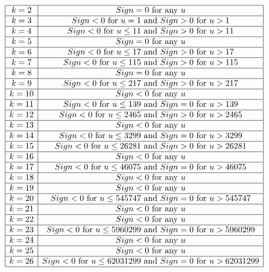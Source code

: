 \documentclass{llncs}
\begin{document}
\begin{table}
\[
\begin{array}{|c|c|}
\hline 
k=2 & Sign=0 \hbox{ for any } u \\
\hline
k=3 & Sign <0 \hbox{ for } u=1 \hbox{ and } Sign > 0 \hbox{ for } u >1\\
\hline
k=4 & Sign <0 \hbox{ for } u \leq 11 \hbox{ and } Sign > 0 \hbox{ for } u >11\\
\hline
k=5 & Sign=0 \hbox{ for any } u \\
\hline 
k=6 & Sign <0 \hbox{ for } u \leq 17 \hbox{ and } Sign > 0 \hbox{ for } u >17\\
\hline
k=7 & Sign <0 \hbox{ for } u \leq 115 \hbox{ and } Sign > 0 \hbox{ for } u >115\\
\hline
k=8 & Sign=0 \hbox{ for any } u \\ 
\hline
k=9 & Sign <0 \hbox{ for } u \leq 217 \hbox{ and } Sign > 0 \hbox{ for } u >217\\
\hline
k=10 & Sign<0 \hbox{ for any } u \\ 
\hline
k=11 & Sign <0 \hbox{ for } u \leq 139 \hbox{ and } Sign = 0 \hbox{ for } u >139\\
\hline
k=12 & Sign <0 \hbox{ for } u \leq 2465 \hbox{ and } Sign > 0 \hbox{ for } u >2465\\
\hline
k=13 & Sign<0 \hbox{ for any } u \\ 
\hline
k=14 & Sign <0 \hbox{ for } u \leq 3299 \hbox{ and } Sign = 0 \hbox{ for } u >3299\\
\hline
k=15 & Sign <0 \hbox{ for } u \leq 26281 \hbox{ and } Sign > 0 \hbox{ for } u >26281\\
\hline
k=16 & Sign<0 \hbox{ for any } u\\
\hline
k=17 & Sign <0 \hbox{ for } u \leq 46075 \hbox{ and } Sign = 0 \hbox{ for } u >46075\\
\hline
k=18 & Sign <0 \hbox{ for any } u\\
\hline
k=19 & Sign <0 \hbox{ for any } u\\
\hline
k=20 & Sign <0 \hbox{ for } u \leq 545747 \hbox{ and } Sign = 0 \hbox{ for } u >545747\\
\hline
k=21 & Sign <0 \hbox{ for any } u\\
\hline
k=22 & Sign <0 \hbox{ for any } u\\
\hline
k=23 & Sign <0 \hbox{ for } u \leq 5960299 \hbox{ and } Sign = 0 \hbox{ for } u >5960299\\
\hline
k=24 & Sign <0 \hbox{ for any } u\\
\hline
k=25 & Sign <0 \hbox{ for any } u\\
\hline
k=26 & Sign <0 \hbox{ for } u \leq 62031299 \hbox{ and } Sign = 0 \hbox{ for } u >62031299\\
\hline
\end{array}
\]
\caption{Comparison between a perfect binary tree and a perfect ternary tree. If $Sign<0$ a perfect ternary tree has a better running time. 
If $Sign=0$ the two trees give the same running time. Otherwise a perfect binary tree is better.}
\label{Compar_perfect_binary_ternary}
\end{table}
\end{document}
